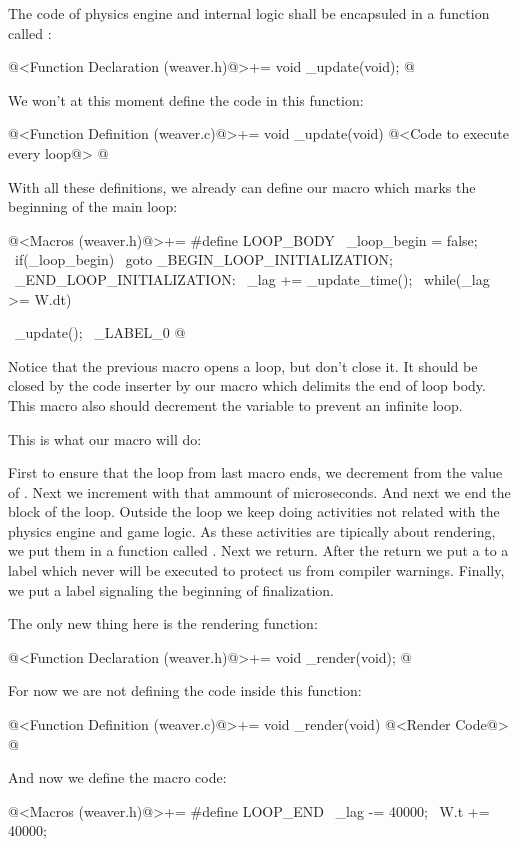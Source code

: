 The code of physics engine and internal logic shall be encapsuled in a
function called :

\iniciocodigo
@<Function Declaration (weaver.h)@>+=
void _update(void);
@
\fimcodigo

We won't at this moment define the code in this function:

\iniciocodigo
@<Function Definition (weaver.c)@>+=
void _update(void){
  @<Code to execute every loop@>
}
@
\fimcodigo

With all these definitions, we already can define our macro which
marks the beginning of the main loop:

\iniciocodigo
@<Macros (weaver.h)@>+=
#define LOOP_BODY                                            \
  _loop_begin =  false;                                      \
  if(_loop_begin)                                            \
    goto _BEGIN_LOOP_INITIALIZATION;                         \
_END_LOOP_INITIALIZATION:                                    \
  _lag += _update_time();                                    \
  while(_lag >= W.dt){                                       \
    _update();                                               \
_LABEL_0
@
\fimcodigo

Notice that the previous macro opens a \monoespaco{while} loop, but
don't close it. It should be closed by the code inserter by our macro
which delimits the end of loop body. This macro also should decrement
the variable \monoespaco{\_lag} to prevent an infinite loop.


This is what our macro  will do:

First to ensure that the loop from last macro ends, we decrement from
\monoespaco{\_lag} the value of \monoespaco{W.dt}. Next we increment
\monoespaco{W.t} with that ammount of microseconds. And next we end
the block of the loop. Outside the loop we keep doing activities not
related with the physics engine and game logic. As these activities
are tipically about rendering, we put them in a function called 
\monoespaco{\_render}. Next we return. After the return we put a
 to a label which never will be executed to protect us
from compiler warnings. Finally, we put a label signaling the
beginning of finalization.

The only new thing here is the rendering function:

\iniciocodigo
@<Function Declaration (weaver.h)@>+=
void _render(void);
@
\fimcodigo

For now we are not defining the code inside this function:

\iniciocodigo
@<Function Definition (weaver.c)@>+=
void _render(void){
  @<Render Code@>
}
@
\fimcodigo

And now we define the macro code:

\iniciocodigo
@<Macros (weaver.h)@>+=
#define LOOP_END                                           \
    _lag -=  40000;                                        \
    W.t +=  40000;                                         \
  }                                                        \

